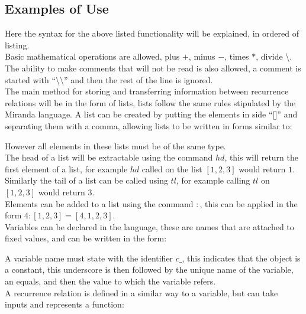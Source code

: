 \documentclass{article}
\begin{document}
\subsection{Examples of Use}
Here the syntax for the above listed functionality will be explained, in ordered of listing.\\
Basic mathematical operations are allowed, plus $+$, minus $-$, times $*$, divide \textbackslash. The ability to make comments that will not be read is also allowed, a comment is started with ``\textbackslash\textbackslash'' and then the rest of the line is ignored.\\ 
The main method for storing and transferring information between recurrence relations will be in the form of lists, lists follow the same rules stipulated by the Miranda language. A list can be created by putting the elements in side ``[]'' and separating them with a comma, allowing lists to be written in forms similar to:

However all elements in these lists must be of the same type.\\
The head of a list will be extractable using the command $hd$, this will return the first element of a list, for example $hd$ called on the list $[1,2,3]$ would return $1$. Similarly the tail of a list can be called using $tl$, for example calling $tl$ on $[1,2,3]$ would return $3$.\\  
Elements can be added to a list using the command $:$, this can be applied in the form $4:[1,2,3] = [4,1,2,3]$.\\
Variables can be declared in the language, these are names that are attached to fixed values, and can be written in the form: 

A variable name must state with the identifier $c\_$, this indicates that the object is a constant, this underscore is then followed by the unique name of the variable, an equals, and then the value to which the variable refers.\\   
A recurrence relation is defined in a similar way to a variable, but can take inputs and represents a function:

\end{document}
